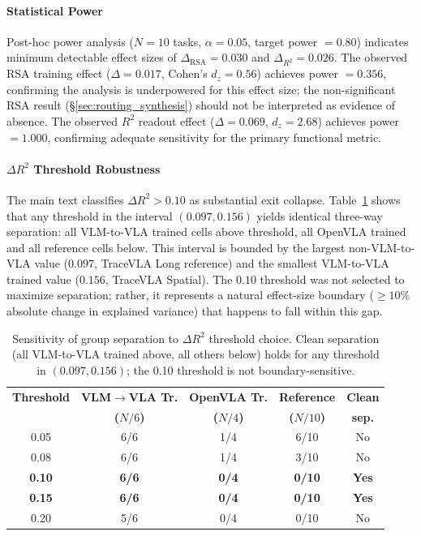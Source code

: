 \paragraph{Statistical Power}
Post-hoc power analysis ($N = 10$ tasks, $\alpha = 0.05$, target power $= 0.80$) indicates minimum detectable effect sizes of $\Delta_{\text{RSA}} = 0.030$ and $\Delta_{R^2} = 0.026$.
The observed RSA training effect ($\Delta = 0.017$, Cohen's $d_z = 0.56$) achieves power $= 0.356$, confirming the analysis is underpowered for this effect size; the non-significant RSA result (\S\ref{sec:routing_synthesis}) should not be interpreted as evidence of absence.
The observed $R^2$ readout effect ($\Delta = 0.069$, $d_z = 2.68$) achieves power $= 1.000$, confirming adequate sensitivity for the primary functional metric.

\paragraph{$\Delta R^2$ Threshold Robustness}
\label{sec:delta_r2_threshold}

The main text classifies $\Delta R^2 > 0.10$ as substantial exit collapse.
Table~\ref{tab:delta_r2_threshold} shows that any threshold in the interval $(0.097, 0.156)$ yields identical three-way separation: all VLM-to-VLA trained cells above threshold, all OpenVLA trained and all reference cells below.
This interval is bounded by the largest non-VLM-to-VLA value ($0.097$, TraceVLA Long reference) and the smallest VLM-to-VLA trained value ($0.156$, TraceVLA Spatial).
The $0.10$ threshold was not selected to maximize separation; rather, it represents a natural effect-size boundary ($\geq 10\%$ absolute change in explained variance) that happens to fall within this gap.

\begin{table}[h]
\centering
\caption{Sensitivity of group separation to $\Delta R^2$ threshold choice. Clean separation (all VLM-to-VLA trained above, all others below) holds for any threshold in $(0.097, 0.156)$; the 0.10 threshold is not boundary-sensitive.}
\label{tab:delta_r2_threshold}
\small
\begin{tabular}{ccccc}
\toprule
\textbf{Threshold} & \textbf{VLM$\to$VLA Tr.} & \textbf{OpenVLA Tr.} & \textbf{Reference} & \textbf{Clean} \\
& \textbf{($N\!/6$)} & \textbf{($N\!/4$)} & \textbf{($N\!/10$)} & \textbf{sep.} \\
\midrule
0.05 & 6/6 & 1/4 & 6/10 & No \\
0.08 & 6/6 & 1/4 & 3/10 & No \\
\textbf{0.10} & \textbf{6/6} & \textbf{0/4} & \textbf{0/10} & \textbf{Yes} \\
\textbf{0.15} & \textbf{6/6} & \textbf{0/4} & \textbf{0/10} & \textbf{Yes} \\
0.20 & 5/6 & 0/4 & 0/10 & No \\
\bottomrule
\end{tabular}
\end{table}

